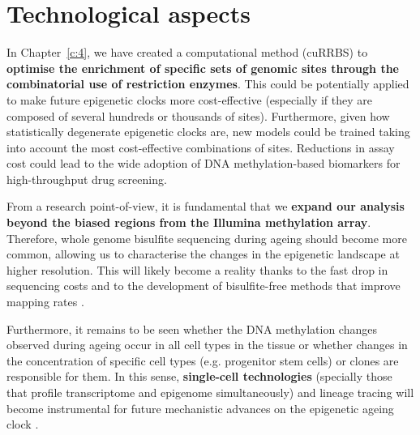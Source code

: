 \smallskip

\section{Technological aspects}

\smallskip

In Chapter~\ref{c:4}, we have created a computational method (cuRRBS) to \textbf{optimise the enrichment of specific sets of genomic sites through the combinatorial use of restriction enzymes}. This could be potentially applied to make future epigenetic clocks more cost-effective (especially if they are composed of several hundreds or thousands of sites). Furthermore, given how statistically degenerate epigenetic clocks are, new models could be trained taking into account the most cost-effective combinations of sites. Reductions in assay cost could lead to the wide adoption of DNA methylation-based biomarkers for high-throughput drug screening.

\bigskip

From a research point-of-view, it is fundamental that we \textbf{expand our analysis beyond the biased regions from the Illumina methylation array}. Therefore, whole genome bisulfite sequencing during ageing should become more common, allowing us to characterise the changes in the epigenetic landscape at higher resolution. This will likely become a reality thanks to the fast drop in sequencing costs and to the development of bisulfite-free methods that improve mapping rates \citep{Liu2019}. 

\bigskip

Furthermore, it remains to be seen whether the DNA methylation changes observed during ageing occur in all cell types in the tissue or whether changes in the concentration of specific cell types (e.g. progenitor stem cells) or clones are responsible for them. In this sense, \textbf{single-cell technologies} (specially those that profile  transcriptome and epigenome simultaneously) and lineage tracing will become instrumental for future mechanistic advances on the epigenetic ageing clock \citep{Kelsey2017}.